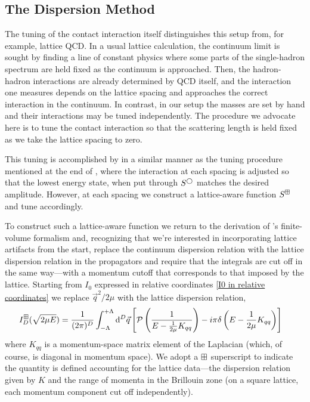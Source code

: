 \subsection{The Dispersion Method}\label{sec:dispersion}

The tuning of the contact interaction itself distinguishes this setup from, for example, lattice QCD.
In a usual lattice calculation, the continuum limit is sought by finding a line of constant physics where some parts of the single-hadron spectrum are held fixed as the continuum is approached.
Then, the hadron-hadron interactions are already determined by QCD itself, and the interaction one measures depends on the lattice spacing and approaches the correct interaction in the continuum.
In contrast, in our setup the masses are set by hand and their interactions may be tuned independently.
The procedure we advocate here is to tune the contact interaction so that the scattering length is held fixed as we take the lattice spacing to zero.

This tuning is accomplished by in a similar manner as the tuning procedure mentioned at the end of , where the interaction at each spacing is adjusted so that the lowest energy state, when put through $S^{\bigcirc}$ matches the desired amplitude.
However, at each spacing we construct a lattice-aware function $S^{\boxplus}$ and tune accordingly.

To construct such a lattice-aware function we return to the derivation of \Luscher's finite-volume formalism and, recognizing that we're interested in incorporating lattice artifacts from the start, replace the continuum dispersion relation with the lattice dispersion relation in the propagators and require that the integrals are cut off in the same way---with a momentum cutoff that corresponds to that imposed by the lattice.
Starting from $I_0$ expressed in relative coordinates \eqref{I0 in relative coordinates} we replace $\vec{q}^2/2\mu$ with the lattice dispersion relation,
\begin{align}
    \label{eq:dispersion I0}
    I_D^{\boxplus}(\sqrt{2 \mu E})
    &=\frac{1}{(2\pi)^D}
    \int_{-\Lambda}^{+\Lambda}
        \mathrm{d}^D \vec{q}
        \left[
            \mathcal{P} \left(
                \frac{1}{
                    E - \frac{1}{2\mu} K_{qq} }
                \right)
            -i \pi \delta\left(E - \frac{1}{2\mu}K_{qq}\right)
        \right]
\end{align}
where $K_{qq}$ is a momentum-space matrix element of the Laplacian (which, of course, is diagonal in momentum space).
We adopt a $\boxplus$ superscript to indicate the quantity is defined accounting for the lattice data---the dispersion relation given by $K$ and the range of momenta in the Brillouin zone (on a square lattice, each momentum component cut off independently).

